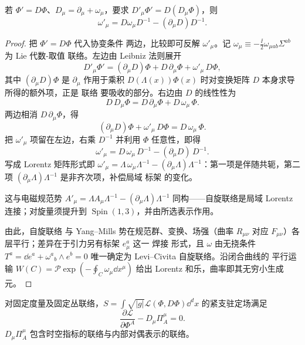 \begin{proposition}[局域标架变换的联络律]
若 $\Phi'=D\Phi$、$D_\mu=\partial_\mu+\omega_\mu$，要求 $D'_\mu\Phi'=D(D_\mu\Phi)$，则\[\omega'_\mu=D\omega_\mu D^{-1}-(\partial_\mu D)D^{-1}.\]
\end{proposition}

\begin{proof}
把 $\Phi'=D\Phi$ 代入协变条件 两边，比较即可反解 $\omega'_\mu$。记 $\omega_\mu\equiv-\frac{\ii}{2}\omega_{\mu ab}\Sigma^{ab}$ 为 Lie 代数-取值 联络。左边由 Leibniz 法则展开
\begin{equation*}
D'_\mu\Phi'=(\partial_\mu D)\Phi+D\,\partial_\mu\Phi+\omega'_\mu\,D\Phi,
\end{equation*}
其中 $(\partial_\mu D)\Phi$ 是 $\partial_\mu$ 作用于乘积 $D(\Lambda(x))\Phi(x)$ 时对变换矩阵 $D$ 本身求导所得的额外项，正是 联络 要吸收的部分。右边由 $D$ 的线性性为
\begin{equation*}
D\,D_\mu\Phi=D\,\partial_\mu\Phi+D\,\omega_\mu\,\Phi.
\end{equation*}
两边相消 $D\,\partial_\mu\Phi$，得
\begin{equation*}
(\partial_\mu D)\Phi+\omega'_\mu\,D\Phi=D\,\omega_\mu\,\Phi.
\end{equation*}
把 $\omega'_\mu$ 项留在左边，右乘 $D^{-1}$ 并利用 $\Phi$ 任意性，即得
\begin{equation}\label{eq:ms-curved-omega-transform}
{
\omega'_\mu=D\,\omega_\mu\,D^{-1}-(\partial_\mu D)\,D^{-1}.
}
\end{equation}
写成 Lorentz 矩阵形式即 $\omega'_\mu=\Lambda\,\omega_\mu\Lambda^{-1}-(\partial_\mu\Lambda)\Lambda^{-1}$：第一项是伴随共轭，第二项 $(\partial_\mu\Lambda)\Lambda^{-1}$ 是非齐次项，补偿局域 标架 的变化。

这与电磁规范势 $A'_\mu=\Lambda A_\mu\Lambda^{-1}-(\partial_\mu\Lambda)\Lambda^{-1}$ 同构——自旋联络是局域 Lorentz 连接；对旋量须提升到 $\operatorname{Spin}(1,3)$，并由所选表示作用。

由此，自旋联络 与 Yang--Mills 势在规范群、变换、场强（曲率 $R_{\mu\nu}$ 对应 $F_{\mu\nu}$）各层平行；差异在于引力另有标架 $e_\mu^a$ 这一 焊接 形式，且 $\omega$ 由无挠条件 $T^a=\dd e^a+\omega^a{}_b\wedge e^b=0$ 唯一确定为 Levi--Civita 自旋联络。沿闭合曲线的 平行运输 $W(C)=\mathcal P\exp(-\oint_C\omega_\mu\dd x^\mu)$ 给出 Lorentz 和乐，曲率即其无穷小生成元。
\end{proof}

\begin{proposition}
对固定度量及固定丛联络，$S=\int\sqrt{|g|}\mathcal L(\Phi,D\Phi)\dd^dx$ 的紧支驻定场满足\[\frac{\partial\mathcal L}{\partial\Phi^A}-D_\mu\Pi_A^\mu=0.\]$D_\mu\Pi_A^\mu$ 包含时空指标的联络与内部对偶表示的联络。
\end{proposition}

